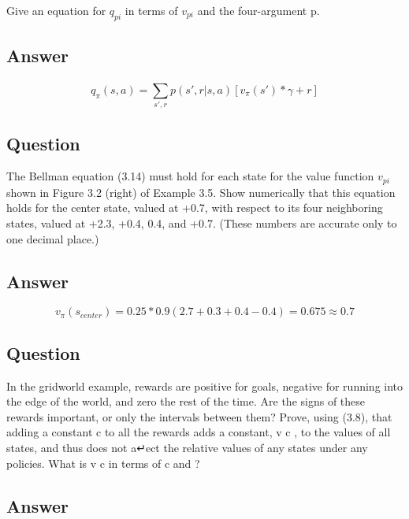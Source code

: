 \documentclass[11pt]{article}
\begin{document}
    Give an equation for $q_{pi}$ in terms of $v_{pi}$ and the four-argument p.

    \subsection*{Answer}

    \begin{equation}
        q_{\pi}(s, a) = \sum_{s',r}^{} p(s', r | s, a) [v_{\pi}(s')*\gamma + r ]
    \end{equation}

    \subsection{Question}

    The Bellman equation (3.14) must hold for each state for the value function $v_{pi}$ shown in Figure 3.2 (right) of Example 3.5.
    Show numerically that this equation holds for the center state, valued at +0.7, with respect to its four neighboring states, valued at +2.3, +0.4, 0.4, and +0.7.
    (These numbers are accurate only to one decimal place.)

    \subsection*{Answer}

    \begin{equation}
        v_{\pi}(s_{center}) = 0.25 * 0.9 ( 2.7 + 0.3 + 0.4 -0.4 ) = 0.675 \approx 0.7
    \end{equation}

    \subsection{Question}

    In the gridworld example, rewards are positive for goals, negative for running into the edge of the world, and zero the rest of the time.
    Are the signs of these rewards important, or only the intervals between them?
    Prove, using (3.8), that adding a constant c to all the rewards adds a constant, v c , to the values of all states, and thus does not a↵ect the relative values of any states under any policies.
    What is v c in terms of c and ?

    \subsection*{Answer}
\end{document}
